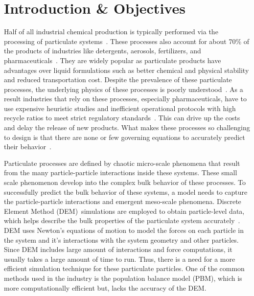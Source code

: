 \documentclass[preprint,11pt,authoryear]{elsarticle}
\begin{document}
\section{Introduction \& Objectives} 
Half of all industrial chemical production is typically performed via the
processing of particulate systems~\citep{seville1997}. These processes also account
for about 70\% of the products of industries like detergents, aerosols,
fertilizers, and pharmaceuticals~\citep{Litster2016}. They are
widely popular as particulate products have advantages over liquid
formulations such as better chemical and physical stability and reduced
transportation cost. Despite the prevalence of these particulate processes,
the underlying physics of these processes is poorly
understood~\citep{Rogers2013}. As a result industries that rely on these
processes, especially pharmaceuticals, have to use expensive heuristic studies
and inefficient operational protocols with high recycle ratios to meet strict
regulatory standards~\citep{Ramachandran2009}. This can drive up the costs and
delay the release of new products. What makes these processes so challenging
to design is that there are none or few governing equations to accurately
predict their behavior~\citep{sen2013}.

Particulate processes are defined by chaotic micro-scale phenomena that result
from the many particle-particle interactions inside these systems. These small
scale phenomenon develop into the complex bulk behavior of these processes. To
successfully predict the bulk behavior of these systems, a model needs to
capture the particle-particle interactions and emergent meso-scale phenomena. 
Discrete Element Method (DEM)~\citep{Cundall1979}simulations are employed 
to obtain particle-level data, which helps describe the bulk properties 
of the particulate system accurately~\citep{Hancock2011}. DEM uses Newton's 
equations of motion to model the forces on each particle in the system and it's interactions with the system geometry and other particles. Since DEM
includes large amount of interactions and force computations, it usually takes
a large amount of time to run. Thus, there is a need for a more efficient
simulation technique for these particulate particles. One of the common
methods used in the industry is the population balance model (PBM), which is
more computationally efficient but, lacks the accuracy of the DEM.
\end{document}
